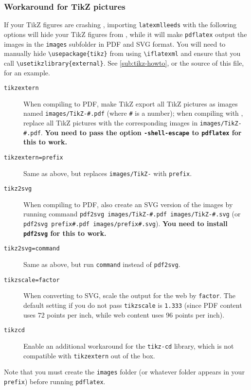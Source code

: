 \documentclass[a4paper]{article}
\def\ltxinline{\lstinline[style=latexml,frame=none]}
\theoremstyle{definition}
\begin{document}
\subsubsection{Workaround for TikZ pictures}
\label{ssub:TikZ}
If your TikZ figures are crashing \LaTeXML{}, importing \verb|latexmlleeds| with the following options will hide your TikZ figures from \LaTeXML{}, while it will make \verb|pdflatex| output the images in the \verb|images| subfolder in PDF and SVG format. You will need to manually hide \ltxinline|\usepackage{tikz}| from \LaTeXML{} using \ltxinline|\iflatexml| and ensure that you call \ltxinline|\usetikzlibrary{external}|. See \autoref{sub:tikz-howto}, or the source of this file, for an example.
\begin{description}
  \item[\texttt{tikzextern}] When compiling to PDF, make TikZ export all TikZ pictures as images named \verb|images/TikZ-#.pdf| (where \verb|#| is a number); when compiling with \LaTeXML{}, replace all TikZ pictures with the corresponding images in \verb|images/TikZ-#.pdf|. \textbf{You need to pass the option \texttt{-shell-escape} to \texttt{pdflatex} for this to work.}
  \item[\texttt{tikzextern=prefix}] Same as above, but replaces \verb|images/TikZ-| with \verb|prefix|.
  \item[\texttt{tikz2svg}] When compiling to PDF, also create an SVG version of the images by running command \verb|pdf2svg images/TikZ-#.pdf images/TikZ-#.svg| (or \verb|pdf2svg prefix#.pdf images/prefix#.svg|). \textbf{You need to install \texttt{pdf2svg} for this to work.}
  \item[\texttt{tikz2svg=command}] Same as above, but run \verb|command| instead of \verb|pdf2svg|.
  \item[\texttt{tikzscale=factor}] When converting to SVG, scale the output for the web by \verb|factor|. The default setting if you do not pass \verb|tikzscale| is \verb|1.333| (since PDF content uses 72 points per inch, while web content uses 96 points per inch).
  \item[\texttt{tikzcd}] Enable an additional workaround for the \verb|tikz-cd| library, which is not compatible with \verb|tikzextern| out of the box.
\end{description}
Note that you must create the \verb|images| folder (or whatever folder appears in your \verb|prefix|) before running \verb|pdflatex|.
\end{document}
